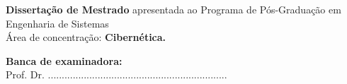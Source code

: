 \begin{center}
\begin{center}
\end{center}


\begin{flushright}
\vspace{0.5in}
\parbox{3.15in}
 {\textbf{Dissertação de Mestrado} apresentada ao Programa de Pós-Graduação em Engenharia de Sistemas\\
 Área de concentração: \textbf{Cibernética.} }
\end{flushright}



\vspace{0.5in}

\begin{flushleft}

\vspace{1ex} \textbf{Banca de examinadora:} \\

\vspace{1ex} Prof. Dr.  ................................................................. \\


\end{flushleft}


\vspace{0.2in}
\dataQualif

\end{center}

